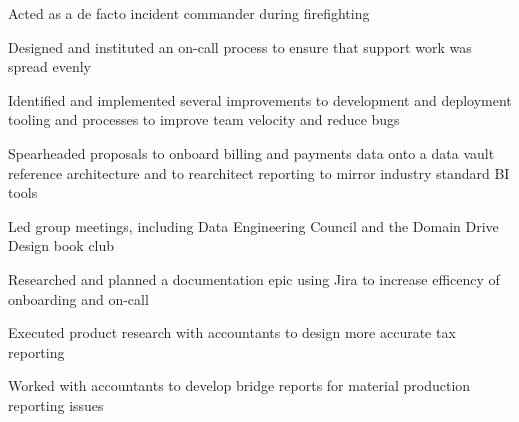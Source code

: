 \begin{job}

  \begin{accomplishments}
    \item Acted as a de facto incident commander during firefighting
    \item Designed and instituted an on-call process to ensure that
    support work was spread evenly
    \item Identified and implemented several improvements to development and
    deployment tooling and processes to improve team velocity and reduce bugs
    \item Spearheaded proposals to onboard billing and payments data onto a data
    vault reference architecture and to rearchitect reporting to mirror industry
    standard BI tools
    \item Led group meetings, including Data Engineering Council and the Domain
    Drive Design book club
    \item Researched and planned a documentation epic using Jira to increase
    efficency of onboarding and on-call
    \item Executed product research with accountants to design more accurate tax
    reporting
    \item Worked with accountants to develop bridge reports for material
      production reporting issues
  \end{accomplishments}
\end{job}
